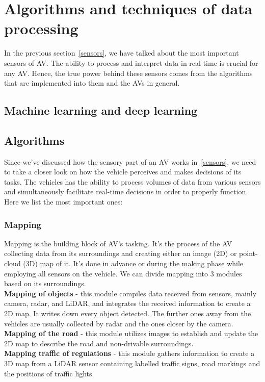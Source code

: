 \documentclass[10pt,oneside,english,a4paper]{article}
\begin{document}

\section{Algorithms and techniques of data processing} \label{algorithms}

In the previous section~\eqref{sensors}, we have talked about the most important sensors of AV. The ability to process and interpret data in real-time is crucial for any AV. Hence, the true power behind these sensors comes from the algorithms that are implemented into them and the AVs in general.  

\subsection{Machine learning and deep learning}
\indent 



\subsection{Algorithms}
\indent Since we've discussed how the sensory part of an AV works in~\ref{sensors}, we need to take a closer look on how the vehicle perceives and makes decisions of its tasks. The vehicles has the ability to process volumes of data from various sensors and simultaneously facilitate real-time decisions in order to properly function. Here we list the most important ones:

\subsubsection{Mapping}
\indent Mapping is the building block of AV's tasking. It's the process of the AV collecting data from its surroundings and creating either an image (2D) or point-cloud (3D) map of it. It's done in advance or during the making phase while employing all sensors on the vehicle. We can divide mapping into 3 modules based on its surroundings.\\
\indent \textbf{Mapping of objects} - this module compiles data received from sensors, mainly camera, radar, and LiDAR, and integrates the received information to create a 2D map. It writes down every object detected. The further ones away from the vehicles are usually collected by radar and the ones closer by the camera.\\
\indent \textbf{Mapping of the road} - this module utilizes images to establish and update the 2D map to describe the road and non-drivable surroundings.\\
\indent \textbf{Mapping traffic of regulations} - this module gathers information to create a 3D map from a LiDAR sensor containing labelled traffic signs, road markings and the positions of traffic lights.  
\cite{stateoftheart}\cite{functionalarch}
\end{document}
